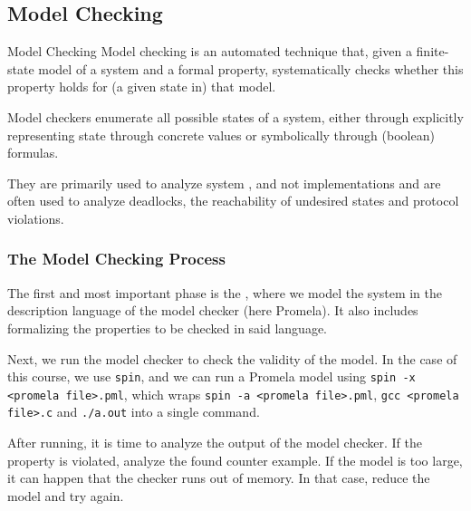 \subsection{Model Checking}
\begin{definition}[]{Model Checking}
    Model checking is an automated technique that, given
    a finite-state model of a system and a formal property,
    systematically checks whether this property holds for
    (a given state in) that model.
\end{definition}

Model checkers enumerate all possible states of a system, either through explicitly representing state through concrete values or symbolically through (boolean) formulas.

They are primarily used to analyze system , and not implementations and are often used to analyze deadlocks, the reachability of undesired states and protocol violations.


\subsubsection{The Model Checking Process}
The first and most important phase is the , where we model the system in the description language of the model checker (here Promela).
It also includes formalizing the properties to be checked in said language.

Next, we run the model checker to check the validity of the model. 
In the case of this course, we use \texttt{spin}, and we can run a Promela model using \texttt{spin -x <promela file>.pml},
which wraps \texttt{spin -a <promela file>.pml}, \texttt{gcc <promela file>.c} and \texttt{./a.out} into a single command.

After running, it is time to analyze the output of the model checker. If the property is violated, analyze the found counter example.
If the model is too large, it can happen that the checker runs out of memory. In that case, reduce the model and try again.
